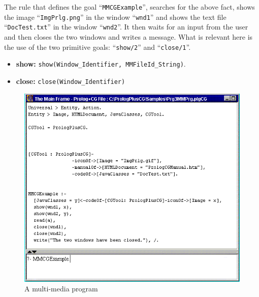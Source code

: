\documentclass{book}
\begin{document}
The rule that defines the goal ``\texttt{MMCGExample}'', searches for
the above fact, shows the image ``\texttt{ImgPrlg.png}'' in the window
``\texttt{wnd1}'' and shows the text file ``\texttt{DocTest.txt}'' in
the window ``\texttt{wnd2}''. It then waits for an input from the user
and then closes the two windows and writes a message. What is relevant
here is the use of the two primitive goals: ``\texttt{show/2}'' and
``\texttt{close/1}''.

\begin{itemize}

   \item {\bf show:} \texttt{show(Window\_Identifier, MMFileId\_String)}.

   \item {\bf close:} \texttt{close(Window\_Identifier)}

\end{itemize}


\begin{latexonly}

\begin{figure}
\begin{center}
\includegraphics[scale=0.6]{MMPrg.png}
\end{center}
\caption{\label{MMPrg}A multi-media program}
\end{figure}

\end{latexonly}
\end{document}
